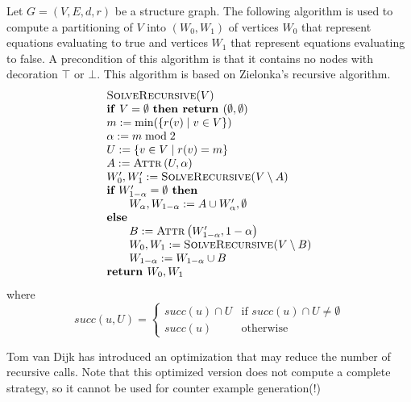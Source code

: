 \documentclass{article}
\begin{document}
Let $G=(V,E,d,r)$ be a structure graph. The following algorithm is used to compute
a partitioning of $V$ into $\left( W_{0},W_{1}\right) $ of vertices $W_{0}$ that
represent equations evaluating to true and vertices $W_{1}$ that represent equations
evaluating to false. A precondition of this algorithm is that it contains no nodes with
decoration $\top $ or $\bot$. This algorithm is based on Zielonka's recursive algorithm.
\begin{equation*}
\begin{array}{l}
\textsc{SolveRecursive}(V) \\ 
\text{\textbf{if} }V=\emptyset \text{ \textbf{then return }}(\emptyset
,\emptyset ) \\ 
m:=\min (\{r(v)\mid v\in V\}) \\ 
\alpha := m \bmod 2 \\ 
U:=\{v\in V\mid r(v)=m\} \\ 
A:=\text{\textsc{Attr}}\left( U,\alpha \right)  \\ 
W_{0}^{\prime },W_{1}^{\prime }:=\text{\textsc{SolveRecursive(}}V\setminus A%
\text{)} \\ 
\textbf{if } W_{1-\alpha }^{\prime }= \emptyset \textbf{ then} \\ 
\qquad W_{\alpha },W_{1-\alpha }:=A\cup W_{\alpha }^{\prime }, \emptyset \\ 
\text{\textbf{else}} \\ 
\qquad B:=\text{\textsc{Attr}}\left( W_{1-\alpha }^{\prime },1-\alpha \right)  \\ 
\qquad W_{0},W_{1}:=\text{\textsc{SolveRecursive(}}V\setminus B\text{)} \\ 
\qquad W_{1-\alpha }:=W_{1-\alpha }\cup B \\ 
\text{\textbf{return }}W_{0},W_{1}%
\end{array}%
\end{equation*}%
where%
\begin{equation*}
succ(u,U)=\left\{ 
\begin{array}{ll}
succ(u)\cap U & \text{if }succ(u)\cap U\neq \emptyset  \\ 
succ(u) & \text{otherwise}%
\end{array}%
\right. 
\end{equation*}

Tom van Dijk has introduced an optimization that may reduce the number of recursive calls. Note that this optimized version does not compute a complete strategy, so it
cannot be used for counter example generation(!)
\end{document}
